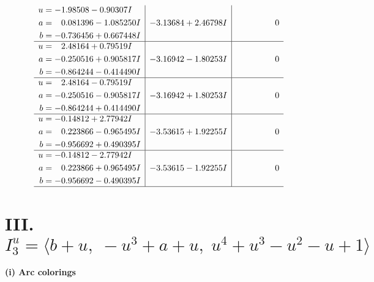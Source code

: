 \documentclass[1p]{elsarticle_modified}
\theoremstyle{definition}
\begin{document}
$$\begin{array}{c|c|c}
\begin{aligned}
u &= -1.98508 - 0.90307 I \\
a &= \phantom{-}0.081396 - 1.085250 I \\
b &= -0.736456 + 0.667448 I\end{aligned}
 & -3.13684 + 2.46798 I & \phantom{-0.000000 } 0 \\ \hline\begin{aligned}
u &= \phantom{-}2.48164 + 0.79519 I \\
a &= -0.250516 + 0.905817 I \\
b &= -0.864244 - 0.414490 I\end{aligned}
 & -3.16942 - 1.80253 I & \phantom{-0.000000 } 0 \\ \hline\begin{aligned}
u &= \phantom{-}2.48164 - 0.79519 I \\
a &= -0.250516 - 0.905817 I \\
b &= -0.864244 + 0.414490 I\end{aligned}
 & -3.16942 + 1.80253 I & \phantom{-0.000000 } 0 \\ \hline\begin{aligned}
u &= -0.14812 + 2.77942 I \\
a &= \phantom{-}0.223866 - 0.965495 I \\
b &= -0.956692 + 0.490395 I\end{aligned}
 & -3.53615 + 1.92255 I & \phantom{-0.000000 } 0 \\ \hline\begin{aligned}
u &= -0.14812 - 2.77942 I \\
a &= \phantom{-}0.223866 + 0.965495 I \\
b &= -0.956692 - 0.490395 I\end{aligned}
 & -3.53615 - 1.92255 I & \phantom{-0.000000 } 0\\
 \hline 
 \end{array}$$\newpage\newpage\renewcommand{\arraystretch}{1}
\centering \section*{III. $I^u_{3}= \langle b+u,\;- u^3+a+u,\;u^4+u^3- u^2- u+1 \rangle$}
\flushleft \textbf{(i) Arc colorings}\\
\end{document}
